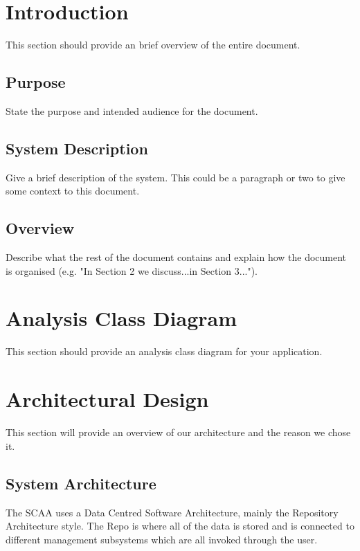 \documentclass[]{article}
\begin{document}
\newpage
\section{Introduction}
\label{sec:introduction}

This section should provide an brief overview of the entire document.

\subsection{Purpose}
\label{sub:purpose}
State the purpose and intended audience for the document.

\subsection{System Description}
\label{sub:system_description}
Give a brief description of the system. This could be a paragraph or two to give some context to this document.


\subsection{Overview}
\label{sub:overview}
Describe what the rest of the document contains and explain how the document is organised (e.g. "In Section 2 we discuss...in Section 3...").



\section{Analysis Class Diagram}
\label{sec:analysis_class_diagram}
This section should provide an analysis class diagram for your application.


\section{Architectural Design}
\label{sec:architectural_design}
This section will provide an overview of our architecture and the reason we chose it.
\subsection{System Architecture}
\label{sub:system_architecture}
The SCAA uses a Data Centred Software Architecture, mainly the Repository Architecture style. The Repo is where all of the data is stored and is connected to different management subsystems which are all invoked through the user. 
\end{document}
